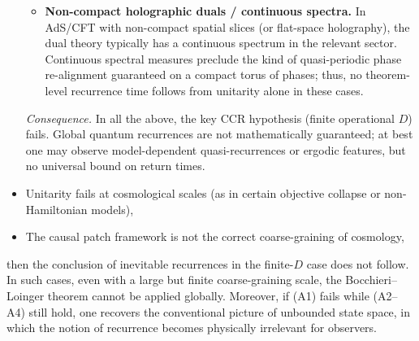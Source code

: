 \documentclass[12pt]{article}
\theoremstyle{remark}
\begin{document}
\begin{itemize}
\begin{itemize}
    \item \textbf{Non-compact holographic duals / continuous spectra.}
    In AdS/CFT with non-compact spatial slices (or flat-space holography), the dual theory typically has
    a continuous spectrum in the relevant sector. Continuous spectral measures preclude the kind of
    quasi-periodic phase re-alignment guaranteed on a compact torus of phases; thus, no theorem-level
    recurrence time follows from unitarity alone in these cases.
\end{itemize}

\noindent\emph{Consequence.} In all the above, the key CCR hypothesis (finite operational $D$) fails.
Global quantum recurrences are not mathematically guaranteed; at best one may observe model-dependent
quasi-recurrences or ergodic features, but no universal bound on return times.

    
    \item Unitarity fails at cosmological scales (as in certain objective collapse or non-Hamiltonian models),
    \item The causal patch framework is not the correct coarse-graining of cosmology,
\end{itemize}
then the conclusion of inevitable recurrences in the finite-$D$ case does not follow.
In such cases, even with a large but finite coarse-graining scale, the Bocchieri–Loinger theorem cannot be applied globally.
Moreover, if (A1) fails while (A2–A4) still hold, one recovers the conventional picture of unbounded state space, in which the notion of recurrence becomes physically irrelevant for observers.
\end{document}
